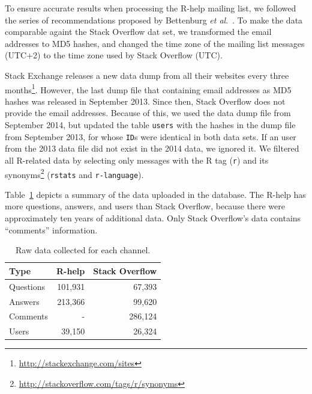     To ensure accurate results when processing the R-help mailing list, we followed the series of recommendations proposed by Bettenburg \textit{et al}.~\cite{Bettenburg2009}.
    To make the data comparable againt the Stack Overflow dat set, we transformed the email addresses to MD5 hashes, and changed the time zone of the mailing list messages (UTC+2) to the time zone used by Stack Overflow (UTC).
    
    Stack Exchange releases a new data dump from all their websites every three months\footnote{\url{http://stackexchange.com/sites}}.
    However, the last dump file that containing email addresses as MD5 hashes was released in September 2013.
    Since then, Stack Overflow does not provide the email addresses.
    Because of this, we used the data dump file from September 2014, but updated the table \texttt{users} with the hashes in the dump file from September 2013, for whose \texttt{ID}s were identical in both data sets.
    If an user from the 2013 data file did not exist in the 2014 data, we ignored it.
    We filtered all R-related data by selecting only messages with the R tag (\texttt{r}) and its synonyms\footnote{\url{http://stackoverflow.com/tags/r/synonyms}} (\texttt{rstats} and \texttt{r-language}).

	Table~\ref{table:data} depicts a summary of the data uploaded in the database.
	The R-help has more questions, answers, and users than Stack Overflow, because there were approximately ten years of additional data.
	Only Stack Overflow's data contains ``comments'' information.

	\begin{table}[!htb]
	  \centering
      \caption{Raw data collected for each channel.}
      \begin{small}
        \begin{tabular}{lrr}
	        \toprule
	        Type          &  R-help & Stack Overflow \\
	        \midrule
	        Questions     & 101,931 &  67,393 \\
	        Answers       & 213,366 &  99,620 \\
	        Comments      &       - & 286,124 \\
	        Users         &  39,150 &  26,324 \\
	        \bottomrule
        \end{tabular}
      \end{small}
	  \label{table:data}
	\end{table}

